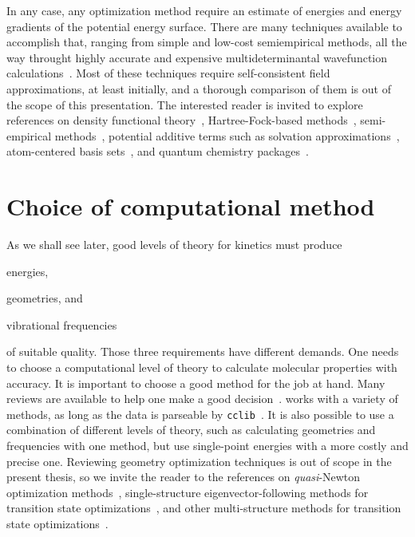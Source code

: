 In any case,
any optimization method require an estimate of energies and energy gradients
of the potential energy surface.
There are many techniques available to accomplish that,
ranging from simple and low-cost semiempirical methods,
all the way throught highly accurate and expensive multideterminantal wavefunction calculations~\cite{Perdew_2001}.
Most of these techniques require self-consistent field approximations,
at least initially,
and a thorough comparison of them is out of the scope of this presentation.
The interested reader is invited to explore
references on density functional theory~\cite{Hohenberg_1964,Kohn_1965,Perdew_1996,Perdew_1997,Ernzerhof_1999,Adamo_1999,Chai_2008a,Chai_2008b,Goerigk_2011,Arago_2011,Salzner_2011,Burns_2011,Minenkov_2012,Perdew_2014,Kryachko_2014,Yu_2016,DFT2016_poll},
Hartree-Fock-based methods~\cite{Szabo_1996},
semi-empirical methods~\cite{MOPAC}, %
potential additive terms such as solvation approximations~\cite{Marenich_2009,Marenich_2012},
atom-centered basis sets~\cite{Ditchfield_1971,Hehre_1972,Hariharan_1973,Hariharan_1974,Gordon_1980,Francl_1982,Clark_1983,Frisch_1984,Binning_1990,Szabo_1996,Helgaker_1997,Blaudeau_1997,Rassolov_1998,Rassolov_2001,Jensen_2012,Hill_2012},
and quantum chemistry packages~\cite{g09}. %

\section{Choice of computational method}

As we shall see later,
good levels of theory for kinetics
must produce
\begin{enumerate*}
	\item energies,
	\item geometries,
	      and
	\item vibrational frequencies
\end{enumerate*}
of suitable quality.
Those three requirements have different demands.
One needs to choose a computational level of theory to calculate
molecular properties with accuracy.
It is important to choose a good method for the job at hand.
Many reviews are available to help one make a good decision~\cite{Goerigk_2011,Goerigk_2019,Mardirossian_2017,Morgante_2020,Bursch_2022}.
\overreact{} works with a variety of methods,
as long as the data is parseable by \texttt{cclib}~\cite{O_boyle_2008}.
It is also possible to use a combination of different levels of theory,
such as calculating geometries and frequencies with one method,
but use single-point energies with a more costly and precise one.
Reviewing geometry optimization techniques is out of scope in the present
thesis,
so we invite the reader to the references
on \emph{quasi}-Newton optimization methods~\cite{Banerjee_1985,Schlegel_1987},
single-structure eigenvector-following methods for transition state optimizations~\cite{Banerjee_1985,Schlegel_1987,Mauro_2005},
and other multi-structure methods for transition state optimizations~\cite{Peng_1993,Peng_1996}.


